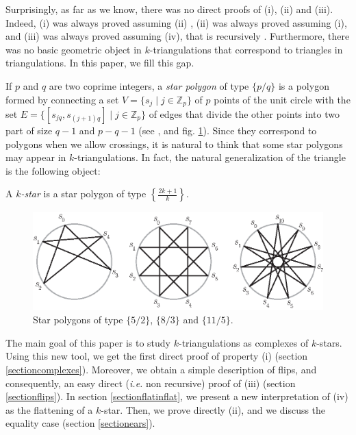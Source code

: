 \documentclass[12pt]{amsart}
\begin{document}
Surprisingly, as far as we know, there was no direct proofs of (i), (ii) and (iii). Indeed, (i) was always proved assuming (ii) \cite{n-gdfcp-00,dkm-lahp-02}, (ii) was always proved assuming (i), and (iii) was always proved assuming (iv), that is recursively \cite{n-gdfcp-00,j-gt-03}. Furthermore, there was no basic geometric object in $k$-triangulations that correspond to triangles in triangulations. In this paper, we fill this gap.

If $p$ and $q$ are two coprime integers, a \emph{star polygon} of type $\{p/q\}$ is a polygon formed by connecting a set $V=\{s_j\;|\; j\in\mathbb{Z}_p\}$ of $p$ points of the unit circle with the set $E=\{[s_{jq},s_{(j+1)q}] \;|\; j\in\mathbb{Z}_p\}$ of edges that divide the other points into two part of size $q-1$ and $p-q-1$ (see \cite[ pp. 93-95]{c-rp-73}, \cite[pp. 36-38]{c-ig-73} and fig. \ref{starpolygons}). Since they correspond to polygons when we allow crossings, it is natural to think that some star polygons may appear in $k$-triangulations. In fact, the natural generalization of the triangle is the following object:

\begin{definition}
A \emph{$k$-star} is a star polygon of type $\left\{\frac{2k+1}{k}\right\}$.
\end{definition}

\begin{figure}
\centerline{\includegraphics[scale=1]{starpolygons.eps}}
\caption{\small{Star polygons of type $\{5/2\}$, $\{8/3\}$ and $\{11/5\}$.}}\label{starpolygons}
\end{figure}

The main goal of this paper is to study $k$-triangulations as complexes of $k$-stars. Using this new tool, we get the first direct proof of property (i) (section \ref{sectioncomplexes}). Moreover, we obtain a simple description of flips, and consequently, an easy direct ({\it i.e.} non recursive) proof of (iii) (section \ref{sectionflips}). In section \ref{sectionflatinflat}, we present a new interpretation of (iv) as the flattening of a $k$-star. Then, we prove directly (ii), and we discuss the equality case (section \ref{sectionears}).
\end{document}
